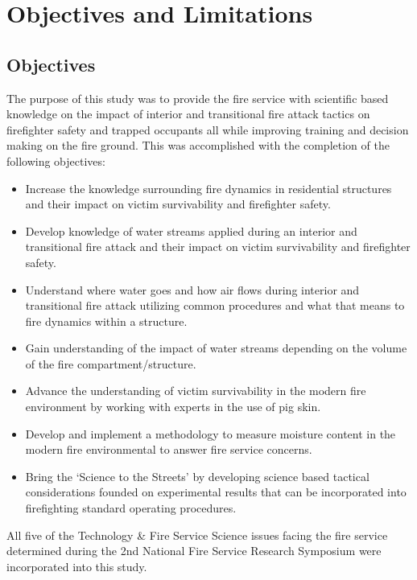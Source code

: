\documentclass[12pt,oneside]{book}
\begin{document}
\clearpage

\chapter{Objectives and Limitations}

\section {Objectives}

The purpose of this study was to provide the fire service with scientific based knowledge on the impact of interior and transitional fire attack tactics on firefighter safety and trapped occupants all while improving training and decision making on the fire ground. This was accomplished with the completion of the following objectives:

\begin{itemize}
	\item Increase the knowledge surrounding fire dynamics in residential structures and their impact on victim survivability and firefighter safety.
	\item Develop knowledge of water streams applied during an interior and transitional fire attack and their impact on victim survivability and firefighter safety.
	\item Understand where water goes and how air flows during interior and transitional fire attack utilizing common procedures and what that means to fire dynamics within a structure.
	\item Gain understanding of the impact of water streams depending on the volume of the fire compartment/structure.
	\item Advance the understanding of victim survivability in the modern fire environment by working with experts in the use of pig skin.
	\item Develop and implement a methodology to measure moisture content in the modern fire environmental to answer fire service concerns.
	\item Bring the `Science to the Streets' by developing science based tactical considerations founded on experimental results that can be incorporated into firefighting standard operating procedures.
	\end{itemize}

All five of the Technology \& Fire Service Science issues facing the fire service determined during the 2nd National Fire Service Research Symposium \cite{NFFF} were incorporated into this study.
\end{document}
